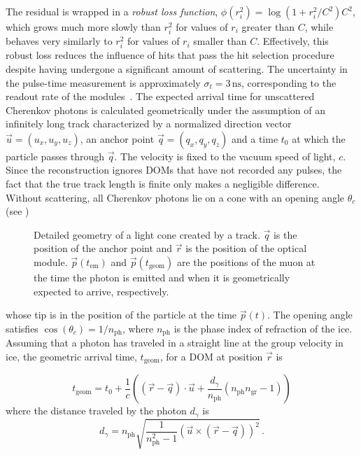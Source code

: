 The residual is wrapped in a \emph{robust loss function}, $\phi(r_{i}^{2})=\log\left(1+r_{i}^{2}/C^2\right)C^2$, which grows much more slowly than $r_{i}^{2}$ for values of $r_i$ greater than $C$, while behaves very similarly to $r_i^2$ for values of $r_i$ smaller than $C$. Effectively, this robust loss reduces the influence of hits that pass the hit selection procedure despite having undergone a significant amount of scattering. The uncertainty in the pulse-time measurement is approximately $\sigma_{t}=3\,\mathrm{ns}$, corresponding to the readout rate of the modules~\cite{icecube_daq}.
The expected arrival time for unscattered Cherenkov photons is calculated geometrically under the assumption of an infinitely long track characterized by a normalized direction vector $\vec{u}=(u_{x},u_{y},u_{z})$,
an anchor point $\vec{q}=(q_{x},q_{y},q_{z})$ and a time $t_{0}$
at which the particle passes through $\vec{q}$. The
velocity is fixed to the vacuum speed of light, $c$. Since the reconstruction ignores DOMs that have not recorded any pulses, the fact that the true track length is finite only makes a negligible  difference.
Without scattering, all Cherenkov photons lie on a cone with an opening
angle $\theta_{c}$ (see )
\begin{figure}[h]
\begin{centering}
\par
\end{centering}
\caption{\label{fig:Detailed-track-geometry}Detailed geometry of a light cone
created by a track. $\vec{q}$ is the position of the anchor point
and $\vec{r}$ is the position of the optical module. $\vec{p}(t_{\mathrm{em}})$
and $\vec{p}(t_{\mathrm{geom}})$ are the positions of the muon at
the time the photon is emitted and when it is geometrically expected
to arrive, respectively.}
\end{figure}
whose tip is in the position of the particle at the time $\vec{p}(t)$. The opening angle satisfies $\cos(\theta_c)=1/n_{\mathrm{ph}}$, where $n_{\mathrm{ph}}$ is the phase index of refraction of the ice.
Assuming that a photon has traveled in a straight line at the group velocity in ice, the geometric arrival time, $t_{\mathrm{geom}}$, for a DOM at position $\vec{r}$ is

\begin{equation}
t_{\mathrm{geom}}=t_{0}+\frac{1}{c}\left(\left(\vec{r}-\vec{q}\right)\cdot\vec{u}+\frac{d_{\gamma}}{n_{\mathrm{ph}}}\left(n_{\mathrm{ph}}n_{\mathrm{gr}}-1\right)\right)\label{eq:t_geom-MS-track}
\end{equation}
where the distance traveled by the photon $d_\gamma$ is
\begin{equation}
d_{\gamma}=n_{\mathrm{ph}}\sqrt{\frac{1}{n_{\mathrm{ph}}^{2}-1}\left(\vec{u}\times\left(\vec{r}-\vec{q}\right)\right)^{2}}\,.\label{eq:photon-distance-3d}
\end{equation}

